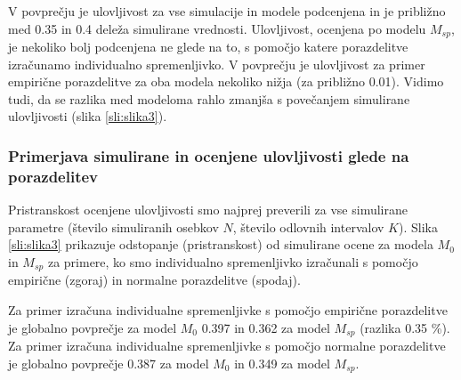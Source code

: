 V povprečju je ulovljivost za vse simulacije in modele podcenjena in je približno med 0.35 in 0.4 deleža simulirane vrednosti. Ulovljivost, ocenjena po modelu $M_{sp}$, je nekoliko bolj podcenjena ne glede na to, s pomočjo katere porazdelitve izračunamo individualno spremenljivko. V povprečju je ulovljivost za primer empirične porazdelitve za oba modela nekoliko nižja (za približno 0.01). Vidimo tudi, da se razlika med modeloma rahlo zmanjša s povečanjem simulirane ulovljivosti (slika \ref{sli:slika3}).

\subsubsection[\bfseries Primerjava simulirane in ocenjene ulovljivosti glede na porazdelitev]{Primerjava simulirane in ocenjene ulovljivosti glede na porazdelitev}
Pristranskost ocenjene ulovljivosti smo najprej preverili za vse simulirane parametre (število simuliranih osebkov $N$, število odlovnih intervalov $K$). Slika \ref{sli:slika3} prikazuje odstopanje (pristranskost) od simulirane ocene za modela $M_0$ in $M_{sp}$ za primere, ko smo individualno spremenljivko izračunali s pomočjo empirične (zgoraj) in normalne porazdelitve (spodaj).

Za primer izračuna individualne spremenljivke s pomočjo empirične porazdelitve je globalno povprečje za model $M_0$ 0.397 in 0.362 za model $M_{sp}$ (razlika 0.35 \%). Za primer izračuna individualne spremenljivke s pomočjo normalne porazdelitve je globalno povprečje 0.387 za model $M_0$ in 0.349 za model $M_{sp}$.

